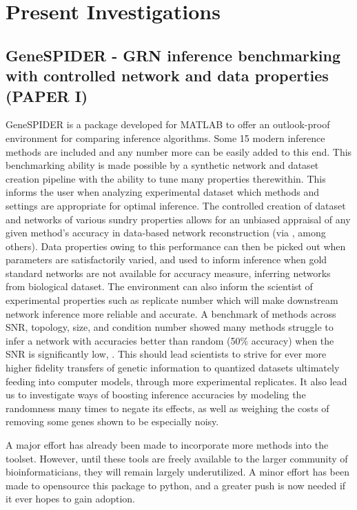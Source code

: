 % 
\chapter{Present Investigations}

\section{GeneSPIDER - GRN inference benchmarking with controlled network and data properties (PAPER I)}\label{sec:paper1}
GeneSPIDER is a package developed for MATLAB to offer an outlook-proof environment for comparing inference algorithms. Some 15 modern inference methods are included and any number more can be easily added to this end. This benchmarking ability is made possible by a synthetic network and dataset creation pipeline with the ability to tune many properties therewithin. This informs the user when analyzing experimental dataset which methods and settings are appropriate for optimal inference. 
The controlled creation of dataset and networks of various sundry properties allows for an unbiased appraisal of any given method's accuracy in data-based network reconstruction (via , among others). Data properties owing to this performance can then be picked out when parameters are satisfactorily varied, and used to inform inference when gold standard networks are not available for accuracy measure, \ie inferring networks from biological dataset. The environment can also inform the scientist of experimental properties such as replicate number which will make downstream network inference more reliable and accurate.
A benchmark of methods across SNR, topology, size, and condition number showed many methods struggle to infer a network with accuracies better than random (50\% accuracy) when the SNR is significantly low, . This should lead scientists to strive for ever more higher fidelity transfers of genetic information to quantized datasets ultimately feeding into computer models, \ie through more experimental replicates. It also lead us to investigate ways of boosting inference accuracies by modeling the randomness many times to negate its effects, as well as weighing the costs of removing some genes shown to be especially noisy.


A major effort has already been made to incorporate more methods into the toolset. However, until these tools are freely available to the larger community of bioinformaticians, they will remain largely underutilized. A minor effort has been made to opensource this package to python, and a greater push is now needed if it ever hopes to gain adoption.


